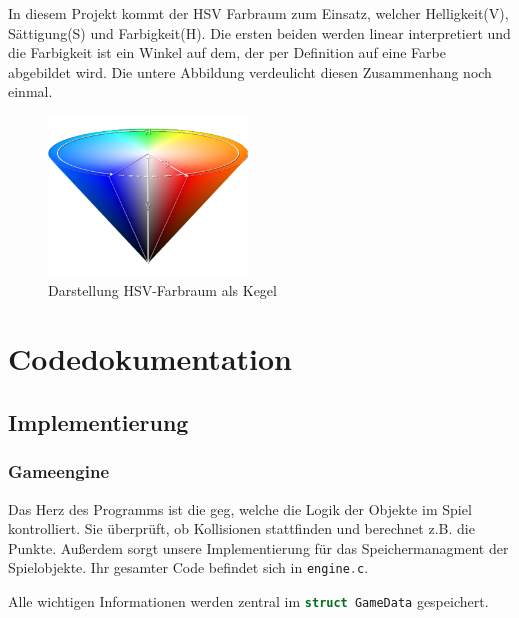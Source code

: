 \documentclass[11pt]{article}
\newcommand{\lstin}[1]{\lstinline[language=C]{#1}}
\begin{document}
In diesem Projekt kommt der HSV Farbraum zum Einsatz, welcher Helligkeit(V), Sättigung(S) und Farbigkeit(H).
Die ersten beiden werden linear interpretiert und die Farbigkeit ist ein Winkel auf dem, der per Definition auf eine Farbe abgebildet wird.
Die untere Abbildung verdeulicht diesen Zusammenhang noch einmal. 
\cite{CS2}
\begin{figure}[h]
  \centering
  \includegraphics[width=200px]{../images/hsv.png}
  \caption{Darstellung HSV-Farbraum als Kegel}
\end{figure}

\pagebreak

\section{Codedokumentation}


\subsection{Implementierung} 

\subsubsection{Gameengine} \label{gem}

Das Herz des Programms ist die \gls{geg}, welche die Logik der Objekte im Spiel kontrolliert.
Sie überprüft, ob Kollisionen stattfinden und berechnet z.B. die Punkte. 
Außerdem sorgt unsere Implementierung für das Speichermanagment der Spielobjekte.
Ihr gesamter Code befindet sich in \lstin{engine.c}.

Alle wichtigen Informationen werden zentral im \lstin{struct GameData} gespeichert.
\end{document}
